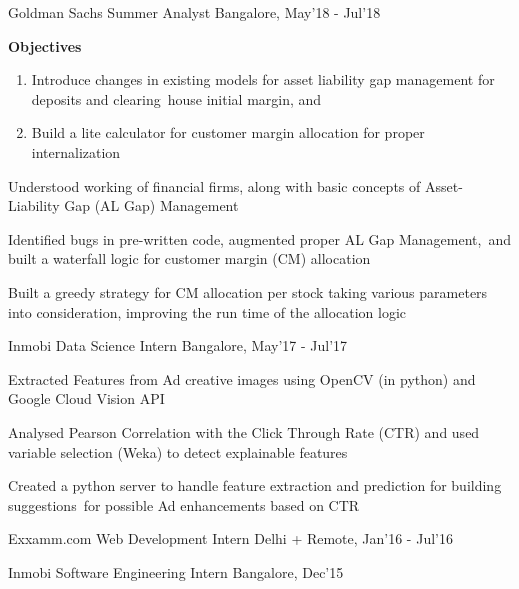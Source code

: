 
\begin{cventries}

	\cventry
	{Goldman Sachs}
	{Summer Analyst}
	{Bangalore, May'18 - Jul'18}
	{}
	{}
	{
		\vspace{-4mm}
		\begin{addmargin}{1em}
			\textbf{Objectives}
			\begin{enumerate}[label=(\roman*)]
				\item Introduce changes in existing models for asset liability gap management for deposits and clearing house initial margin, and
				\item Build a lite calculator for customer margin allocation for proper internalization 
			\end{enumerate}
		\end{addmargin}
		\vspace{4.5mm}
		\begin{cvitems}
		\item Understood working of financial firms, along with basic concepts of Asset-Liability Gap (AL Gap) Management
		\item Identified bugs in pre-written code, augmented proper AL Gap Management, and built a waterfall logic for customer margin (CM) allocation
		\item Built a greedy strategy for CM allocation per stock taking various parameters into consideration, improving the run time of the allocation logic
		\end{cvitems}
	}

	\cventry
	{Inmobi}
	{Data Science Intern}
	{Bangalore, May'17 - Jul'17}
	{}
	{}
	{
		\begin{cvitems}
		\item Extracted Features from Ad creative images using OpenCV (in python) and Google Cloud Vision API
		\item Analysed Pearson Correlation with the Click Through Rate (CTR) and used variable selection (Weka) to detect explainable features 
		\item Created a python server to handle feature extraction and prediction for building suggestions for possible Ad enhancements based on CTR
		\end{cvitems}
	}

	\cventry
	{Exxamm.com}
	{Web Development Intern}
	{Delhi + Remote, Jan'16 - Jul'16}
	{}
	{}
	{}

	\cventry
	{Inmobi}
	{Software Engineering Intern}
	{Bangalore, Dec'15}
	{}
	{}
	{}

\end{cventries}
